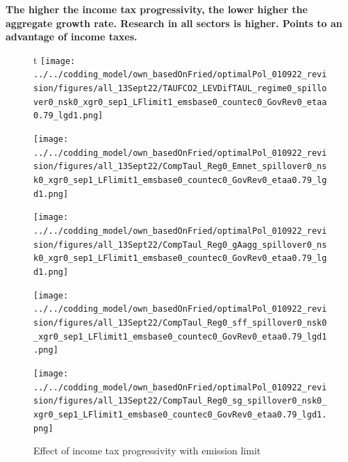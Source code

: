 \textbf{The higher the income tax progressivity, the lower higher the aggregate growth rate. Research in all sectors is higher. \ar Points to an advantage of income taxes.}
\begin{figure}[h!!]
	\centering
	\caption{Effect of income tax progressivity with emission limit }\label{fig:CompTaul_TAUF}	\begin{minipage}[]{0.32\textwidth}
t		\texttt{[image: ../../codding\_model/own\_basedOnFried/optimalPol\_010922\_revision/figures/all\_13Sept22/TAUFCO2\_LEVDifTAUL\_regime0\_spillover0\_nsk0\_xgr0\_sep1\_LFlimit1\_emsbase0\_countec0\_GovRev0\_etaa0.79\_lgd1.png]}
	\end{minipage}	
\begin{minipage}[]{0.32\textwidth}
\texttt{[image: ../../codding\_model/own\_basedOnFried/optimalPol\_010922\_revision/figures/all\_13Sept22/CompTaul\_Reg0\_Emnet\_spillover0\_nsk0\_xgr0\_sep1\_LFlimit1\_emsbase0\_countec0\_GovRev0\_etaa0.79\_lgd1.png]}
\end{minipage}	
\begin{minipage}[]{0.32\textwidth}
\texttt{[image: ../../codding\_model/own\_basedOnFried/optimalPol\_010922\_revision/figures/all\_13Sept22/CompTaul\_Reg0\_gAagg\_spillover0\_nsk0\_xgr0\_sep1\_LFlimit1\_emsbase0\_countec0\_GovRev0\_etaa0.79\_lgd1.png]}
\end{minipage}
\begin{minipage}[]{0.32\textwidth}
\texttt{[image: ../../codding\_model/own\_basedOnFried/optimalPol\_010922\_revision/figures/all\_13Sept22/CompTaul\_Reg0\_sff\_spillover0\_nsk0\_xgr0\_sep1\_LFlimit1\_emsbase0\_countec0\_GovRev0\_etaa0.79\_lgd1.png]}
\end{minipage}	
\begin{minipage}[]{0.32\textwidth}
\texttt{[image: ../../codding\_model/own\_basedOnFried/optimalPol\_010922\_revision/figures/all\_13Sept22/CompTaul\_Reg0\_sg\_spillover0\_nsk0\_xgr0\_sep1\_LFlimit1\_emsbase0\_countec0\_GovRev0\_etaa0.79\_lgd1.png]}
\end{minipage}
\begin{minipage}[]{0.32\textwidth}

\end{minipage}
\end{figure}
